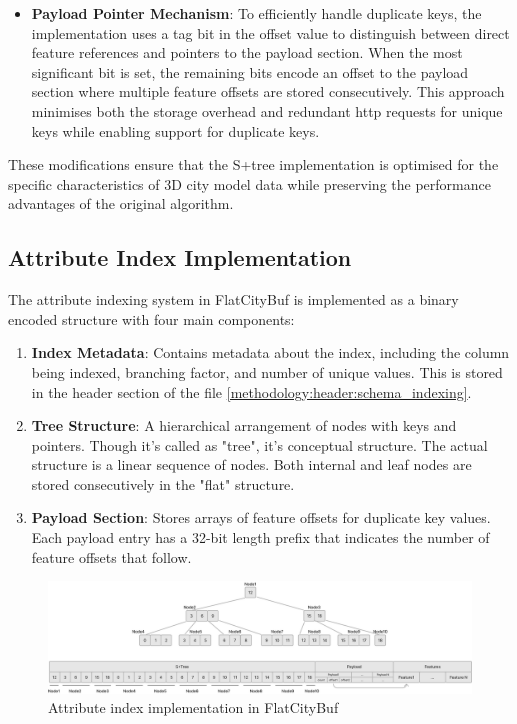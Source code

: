 \begin{itemize}
  \item \textbf{Payload Pointer Mechanism}: To efficiently handle duplicate keys, the implementation uses a tag bit in the offset value to distinguish between direct feature references and pointers to the payload section. When the most significant bit is set, the remaining bits encode an offset to the payload section where multiple feature offsets are stored consecutively. This approach minimises both the storage overhead and redundant \ac{http} requests for unique keys while enabling support for duplicate keys.

\end{itemize}

These modifications ensure that the S+tree implementation is optimised for the specific characteristics of 3D city model data while preserving the performance advantages of the original algorithm.

\subsection{Attribute Index Implementation}
\label{methodology:attribute_index:implementation}

The attribute indexing system in FlatCityBuf is implemented as a binary encoded structure with four main components:

\begin{enumerate}
  \item \textbf{Index Metadata}: Contains metadata about the index, including the column being indexed, branching factor, and number of unique values. This is stored in the header section of the file \autoref{methodology:header:schema_indexing}.
  \item \textbf{Tree Structure}: A hierarchical arrangement of nodes with keys and pointers. Though it's called as "tree", it's conceptual structure. The actual structure is a linear sequence of nodes. Both internal and leaf nodes are stored consecutively in the "flat" structure.
  \item \textbf{Payload Section}: Stores arrays of feature offsets for duplicate key values. Each payload entry has a 32-bit length prefix that indicates the number of feature offsets that follow.
\end{enumerate}

\begin{figure}[htbp]
  \centering
  \includegraphics[width=1.0\textwidth]{figs/methodology/attribute_index.png}
  \caption{Attribute index implementation in FlatCityBuf}
  \label{fig:methodology:attribute_index}
\end{figure}

